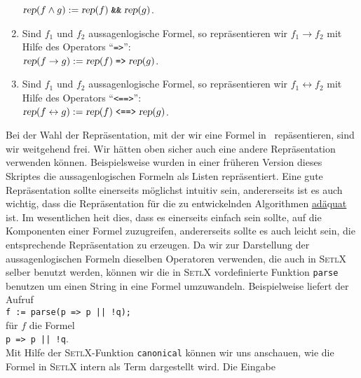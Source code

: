 \begin{enumerate}
      $\textsl{rep}(f \wedge g) := \textsl{rep}(f) \;\texttt{\&\&}\; \textsl{rep}(g)$.
\item Sind $f_1$ und $f_2$ aussagenlogische Formel, so repr\"{a}sentieren wir $f_1 \rightarrow f_2$ mit Hilfe
      des Operators  ``\texttt{=>}'': \\[0.2cm]
      \hspace*{1.3cm} 
      $\textsl{rep}(f \rightarrow g) := \textsl{rep}(f) \;\texttt{=>}\; \textsl{rep}(g)$.
\item Sind $f_1$ und $f_2$ aussagenlogische Formel, so repr\"{a}sentieren wir 
      $f_1 \leftrightarrow f_2$ mit Hilfe des Operators ``\texttt{<==>}'': \\[0.2cm] 
      \hspace*{1.3cm} 
      $\textsl{rep}(f \leftrightarrow g) := 
       \textsl{rep}(f) \;\texttt{<==>}\; \textsl{rep}(g)$.
\end{enumerate}
Bei der Wahl der Repr\"{a}sentation, mit der wir eine Formel in \setl\ rep\"{a}sentieren,
sind wir weitgehend frei.  Wir h\"{a}tten oben sicher auch eine andere Repr\"{a}sentation
verwenden k\"{o}nnen.  Beispielsweise wurden in einer fr\"{u}heren Version dieses Skriptes die
aussagenlogischen Formeln als Listen repr\"{a}sentiert.
Eine gute Repr\"{a}sentation sollte einerseits m\"{o}glichst intuitiv sein, andererseits ist
es auch wichtig, dass die Repr\"{a}sentation f\"{u}r die zu entwickelnden Algorithmen \underline{ad\"{a}}q\underline{uat}
ist.  Im wesentlichen hei\3t dies, dass es einerseits einfach sein sollte, auf
die Komponenten einer Formel zuzugreifen, andererseits sollte es auch leicht sein,
die entsprechende Repr\"{a}sentation zu erzeugen.  Da wir zur Darstellung der
aussagenlogischen Formeln dieselben Operatoren verwenden, die auch in \textsc{SetlX} selber
benutzt werden, k\"{o}nnen wir die in \textsc{SetlX} vordefinierte Funktion \texttt{parse}
benutzen um einen String in eine Formel umzuwandeln.  Beispielweise liefert der Aufruf
\\[0.2cm]
\hspace*{1.3cm}
\texttt{f := parse(p => p || !q);}
\\[0.2cm]
f\"{u}r $f$ die Formel
\\[0.2cm]
\hspace*{1.3cm}
\texttt{p => p || !q}.
\\[0.2cm]
Mit Hilfe der \textsc{SetlX}-Funktion \texttt{canonical} k\"{o}nnen wir uns anschauen, wie die
Formel in \textsc{SetlX} intern als Term dargestellt wird.  Die Eingabe
\\[0.2cm]
